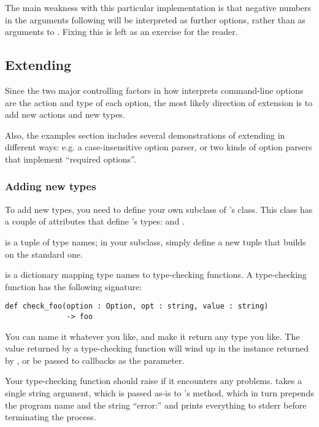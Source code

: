 The main weakness with this particular implementation is that negative
numbers in the arguments following  will be interpreted
as further options, rather than as arguments to .
Fixing this is left as an exercise for the reader.

\subsection{Extending \label{optparse-extending}}

Since the two major controlling factors in how 
interprets command-line options are the action and type of each
option, the most likely direction of extension is to add new actions
and new types.

Also, the examples section includes several demonstrations of
extending  in different ways: e.g. a case-insensitive
option parser, or two kinds of option parsers that implement
``required options''.

\subsubsection{Adding new types\label{optparse-adding-types}}

To add new types, you need to define your own subclass of
's  class.  This class has a couple of
attributes that define 's types:  and
.

 is a tuple of type names; in your subclass, simply
define a new tuple  that builds on the standard one.

 is a dictionary mapping type names to
type-checking functions.  A type-checking function has the following
signature:

\begin{verbatim}
def check_foo(option : Option, opt : string, value : string)
              -> foo
\end{verbatim}

You can name it whatever you like, and make it return any type you
like.  The value returned by a type-checking function will wind up in
the  instance returned by
, or be passed to callbacks as the
 parameter.

Your type-checking function should raise 
if it encounters any problems.   takes a
single string argument, which is passed as-is to
's  method, which in turn prepends
the program name and the string ``error:'' and prints everything to
stderr before terminating the process.

